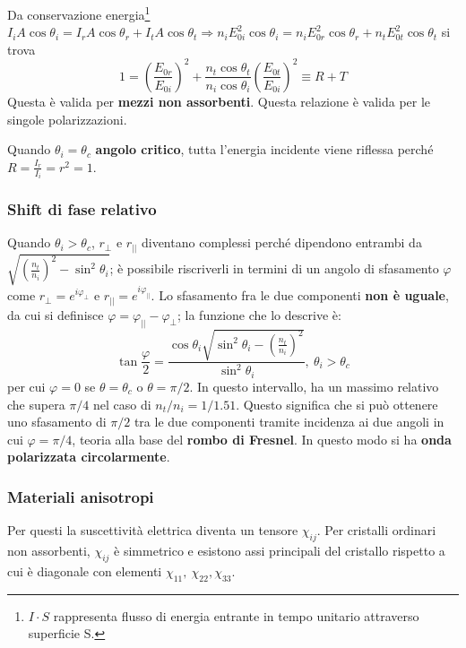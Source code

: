 \documentclass[10pt, a4paper]{scrartcl}
\numberwithin{equation}{subsection}
\theoremstyle{style1}
\begin{document}
Da conservazione energia\footnote{$I\cdot S$ rappresenta flusso di energia entrante in tempo unitario attraverso superficie S.} $I_i A\cos\theta _i = I_r A\cos\theta _r + I_t A \cos\theta _t\Rightarrow n_i E_{0i}^2 \cos\theta _i = n_i E_{0r} ^2 \cos\theta _r+ n_t E_{0t}^2 \cos\theta _t  $ si trova
\begin{equation}
	1 = \left(\frac{E_{0r} }{E_{0i}}\right) ^2 + \frac{n_t \cos\theta _t}{n_i \cos\theta _i}\left(\frac{E_{0t}}{E_{0i} }\right) ^2 \equiv R +T
\end{equation}
Questa \`e valida per \textbf{mezzi non assorbenti}. Questa relazione \`e valida per le singole polarizzazioni. 

Quando $\theta _i = \theta _c$ \textbf{angolo critico}, tutta l'energia incidente viene riflessa perch\'e $R = \frac{I_r}{I_i}=r^2 = 1$.

\subsubsection{Shift di fase relativo}
Quando $\theta _i > \theta _c$, $r_\perp$ e $r_{| |} $ diventano complessi perch\'e dipendono entrambi da $\sqrt{\left(\frac{n_t}{n_i}\right) ^2 - \sin^2 \theta _i} $; \`e possibile riscriverli in termini di un angolo di sfasamento $\varphi $ come $r_\perp = e^{i \varphi _\perp} $ e $r_{| |}=e^{i\varphi _{| |} }  $. Lo sfasamento fra le due componenti \textbf{non \`e uguale}, da cui si definisce $\varphi = \varphi _{| |} - \varphi _\perp  $; la funzione che lo descrive \`e:
\begin{equation}
	\tan \frac{\varphi }{2}= \frac{\cos \theta _i \sqrt{\sin^2 \theta _i - \left(\frac{n_t}{n_i}\right) ^2} }{\sin^2 \theta _i}, \ \theta _i > \theta _c
\end{equation}
per cui $\varphi =0$ se $\theta =\theta _c$ o $\theta = \pi / 2$. In questo intervallo, ha un massimo relativo che supera $\pi / 4$ nel caso di $n_t / n_i = 1 / 1.51$. Questo significa che si pu\`o ottenere uno sfasamento di $\pi / 2$ tra le due componenti tramite incidenza ai due angoli in cui $\varphi = \pi / 4$, teoria alla base del \textbf{rombo di Fresnel}. In questo modo si ha \textbf{onda polarizzata circolarmente}.
\subsubsection{Materiali anisotropi}

Per questi la suscettivit\`a elettrica diventa un tensore $\chi _{ij} $. Per cristalli ordinari non assorbenti, $\chi _{ij} $ \`e simmetrico e esistono assi principali del cristallo rispetto a cui \`e diagonale con elementi $\chi_{11}, \ \chi _{22} , \chi _{33} $.
\end{document}

